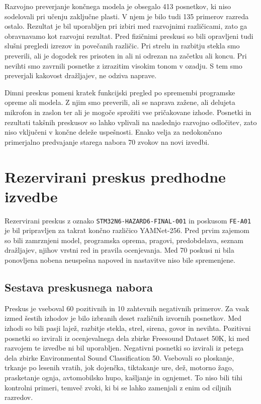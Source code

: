 Razvojno preverjanje končnega modela je obsegalo 413 posnetkov, ki niso
sodelovali pri učenju zaključne plasti. V njem je bilo tudi 135 primerov
razreda ostalo. Rezultat je bil uporabljen pri izbiri med razvojnimi
različicami, zato ga obravnavamo kot razvojni rezultat.
Pred fizičnimi preskusi so bili opravljeni tudi slušni pregledi izrezov in
povečanih različic. Pri strelu in razbitju stekla smo preverili, ali je dogodek
res prisoten in ali ni odrezan na začetku ali koncu. Pri nevihti smo zavrnili
posnetke z izrazitim visokim tonom v ozadju. S tem smo preverjali kakovost
dražljajev, ne odziva naprave.

Dimni preskus pomeni kratek funkcijski pregled po spremembi programske opreme
ali modela. Z njim smo preverili, ali se naprava zažene, ali delujeta mikrofon in
zaslon ter ali je mogoče sprožiti vse pričakovane izhode. Posnetki in rezultati
takšnih preskusov so lahko vplivali na naslednjo razvojno odločitev, zato niso
vključeni v končne deleže uspešnosti. Enako velja za nedokončano primerjalno
predvajanje starega nabora 70 zvokov na novi izvedbi.

\section{Rezervirani preskus predhodne izvedbe}
\label{sec:metodologija-rezervirani}

Rezervirani preskus z oznako
\texttt{STM32N6-HAZARD6-FINAL-001} in poskusom \texttt{FE-A01} je bil
pripravljen za takrat končno različico YAMNet-256. Pred prvim zajemom so bili
zamrznjeni model, programska oprema, pragovi, predobdelava, seznam dražljajev,
njihov vrstni red in pravila ocenjevanja. Med 70 poskusi ni bila ponovljena
nobena neuspešna napoved in nastavitve niso bile spremenjene.

\subsection{Sestava preskusnega nabora}

Preskus je vseboval 60 pozitivnih in 10 zahtevnih negativnih primerov. Za vsak
izmed šestih izhodov je bilo izbranih deset različnih izvornih posnetkov. Med
izhodi so bili pasji lajež, razbitje stekla, strel, sirena,
govor in nevihta. Pozitivni posnetki so izvirali iz ocenjevalnega dela zbirke
Freesound Dataset 50K, ki med razvojem te izvedbe ni bil uporabljen. Negativni
posnetki so izvirali iz petega dela zbirke Environmental Sound Classification
50. Vsebovali so ploskanje, trkanje po lesenih vratih, jok dojenčka, tiktakanje
ure, dež, motorno žago, prasketanje ognja, avtomobilsko hupo, kašljanje in
ognjemet. To niso bili tihi kontrolni primeri, temveč zvoki, ki bi se lahko
zamenjali z enim od ciljnih razredov.

